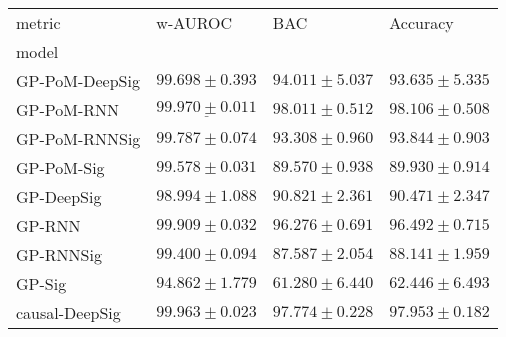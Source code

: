 
\robustify\bfseries

\begin{tabular}{llll}
\toprule
metric &                                        {w-AUROC} &                                            BAC &                                       Accuracy \\
model          &                                                &                                                &                                                \\
\midrule
GP-PoM-DeepSig &                           $ 99.698 \pm 0.393 $ &                           $ 94.011 \pm 5.037 $ &                           $ 93.635 \pm 5.335 $ \\
GP-PoM-RNN     &            $  \underline{ 99.970 \pm 0.011 } $ &                           $ 98.011 \pm 0.512 $ &                           $ 98.106 \pm 0.508 $ \\
GP-PoM-RNNSig  &                           $ 99.787 \pm 0.074 $ &                           $ 93.308 \pm 0.960 $ &                           $ 93.844 \pm 0.903 $ \\
GP-PoM-Sig     &                           $ 99.578 \pm 0.031 $ &                           $ 89.570 \pm 0.938 $ &                           $ 89.930 \pm 0.914 $ \\
GP-DeepSig     &                           $ 98.994 \pm 1.088 $ &                           $ 90.821 \pm 2.361 $ &                           $ 90.471 \pm 2.347 $ \\
GP-RNN         &                           $ 99.909 \pm 0.032 $ &                           $ 96.276 \pm 0.691 $ &                           $ 96.492 \pm 0.715 $ \\
GP-RNNSig      &                           $ 99.400 \pm 0.094 $ &                           $ 87.587 \pm 2.054 $ &                           $ 88.141 \pm 1.959 $ \\
GP-Sig         &                           $ 94.862 \pm 1.779 $ &                           $ 61.280 \pm 6.440 $ &                           $ 62.446 \pm 6.493 $ \\
causal-DeepSig &                           $ 99.963 \pm 0.023 $ &                           $ 97.774 \pm 0.228 $ &                           $ 97.953 \pm 0.182 $ \\

\end{tabular}
